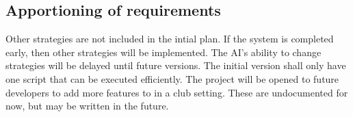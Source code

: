 \subsection{Apportioning of requirements}
Other strategies are not included in the intial plan. If the system is completed early, then other strategies will be implemented.
The AI's ability to change strategies will be delayed until future versions. The initial version shall only have one script that can be executed efficiently.
The project will be opened to future developers to add more features to in a club setting. These are undocumented for now, but may be written in the future.
